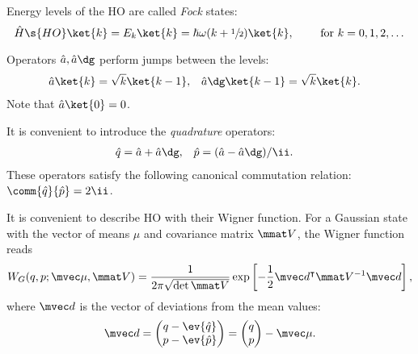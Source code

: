 \documentclass[fontsize=9pt]{scrartcl}
\renewcommand{\hbar}{\hslash}
\begin{document}
Energy levels of the HO are called \emph{Fock} states:
\begin{equation}
  \hat H\s{HO} \ket{ k } = E_k \ket{ k } = \hbar \omega ( k + \sfrac 12 ) \ket{ k },
  \qquad
  \text{ for }
  k = 0,1,2,\dots
\end{equation}

Operators $\hat a, \hat a\dg$ perform jumps between the levels:
\begin{align}
  \hat a \ket{ k }        & = \sqrt{ k } \ket{ k - 1 }, &
  \hat a\dg \ket{ k - 1 } & = \sqrt{ k } \ket {k }.
\end{align}
Note that $\hat a \ket{0} = 0$.

It is convenient to introduce the \emph{quadrature} operators:
\begin{align}
  \hat q & = \hat a + \hat a\dg, &
  \hat p & = ( \hat a - \hat a\dg ) / \ii.
\end{align}
These operators satisfy the following canonical commutation relation: $\comm{ \hat q }{ \hat p } = 2 \ii$.

It is convenient to describe HO with their Wigner function.
For a Gaussian state with the vector of means $\mu$ and covariance matrix $\mmat V$, the Wigner function reads
\begin{equation}
  W_G ( q , p ; \mvec \mu, \mmat V )
  =
  \frac{ 1 }{ 2 \pi \sqrt{ \det \mmat V }}
  \exp\left[
  - \frac 12 \mvec d^\intercal \mmat V^{-1}  \mvec d
  \right],
\end{equation}
where $\mvec d$ is the vector of deviations from the mean values:
\[
  \mvec d
  =
  \begin{pmatrix}
    q - \ev{ \hat q } \\ p - \ev{ \hat p }
  \end{pmatrix}
  =
  \begin{pmatrix}
    q \\ p
  \end{pmatrix}- \mvec \mu.
\]


% 
\end{document}
